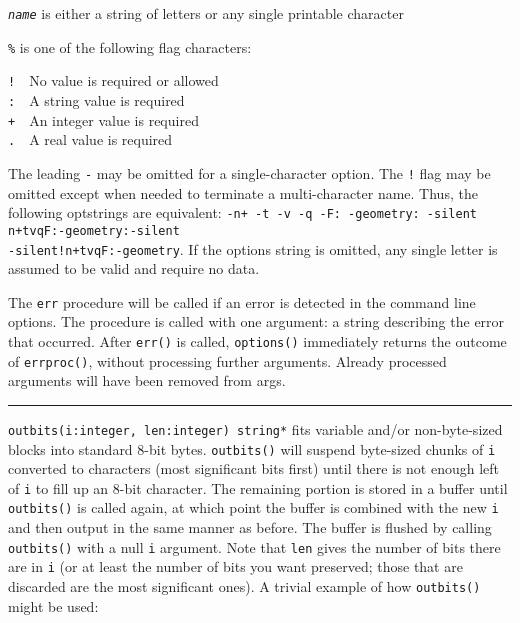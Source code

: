 \texttt{\textit{name}} is either a string of letters or any single
printable character

\texttt{\%} is one of the following flag characters:

\texttt{!}\ \ No value is required or allowed\\
\texttt{:}\ \ A string value is required\\
\texttt{+}\ \ An integer value is required\\
\texttt{.}\ \ A real value is required

The leading \texttt{{\textquotedbl}-{\textquotedbl}} may be omitted for
a single-character option. The \texttt{{\textquotedbl}!{\textquotedbl}}
flag may be omitted except when needed to terminate a multi-character
name. Thus, the following optstrings are equivalent:
\texttt{{\textquotedbl}-n+ -t -v -q -F: -geometry:
-silent{\textquotedbl}}
\texttt{{\textquotedbl}n+tvqF:-geometry:-silent{\textquotedbl}}\\
\texttt{{\textquotedbl}-silent!n+tvqF:-geometry{\textquotedbl}}. If the
options string is omitted, any single letter is assumed to be valid and
require no data.

The \texttt{err} procedure will be called if an error is detected in the
command line options. The procedure is called with one argument: a
string describing the error that occurred. After \texttt{err()} is
called, \texttt{options()} immediately returns the outcome of
\texttt{errproc()}, without processing further arguments. Already
processed arguments will have been removed from args.

\vspace{0.25cm}\hrule{}

\texttt{outbits(i:integer, len:integer) string*} fits variable and/or
non-byte-sized blocks into standard 8-bit bytes. \texttt{outbits()}
will suspend byte-sized chunks of \texttt{i} converted to characters
(most significant bits first) until there is not enough left of
\texttt{i} to fill up an 8-bit character. The remaining portion is
stored in a buffer until \texttt{outbits()} is called again, at which
point the buffer is combined with the new \texttt{i} and then output in
the same manner as before. The buffer is flushed by calling
\texttt{outbits()} with a null \texttt{i} argument. Note that
\texttt{len} gives the number of bits there are in \texttt{i} (or at
least the number of bits you want preserved; those that are discarded
are the most significant ones). A trivial example of how
\texttt{outbits()} might be used:

